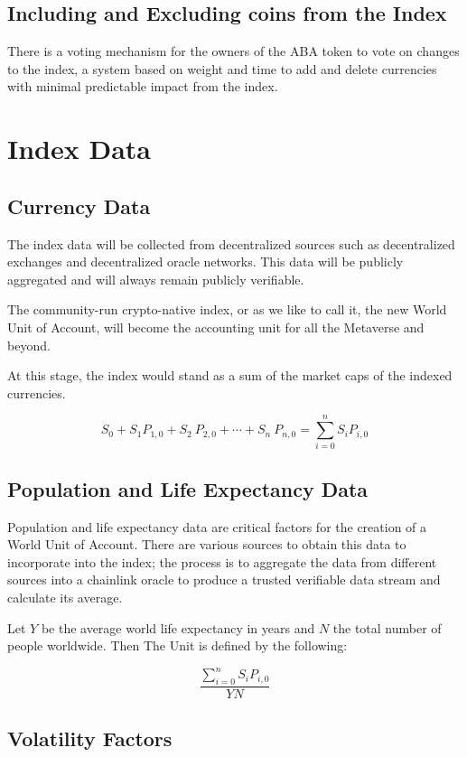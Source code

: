 \documentclass[12pt]{article}
\begin{document}
\subsection{Including and Excluding coins from the Index}

There is a voting mechanism for the owners of the ABA token to vote on changes to the index, a system based on weight and time to add and delete currencies with minimal predictable impact from the index.


\section{Index Data}

\subsection{Currency Data}

The index data will be collected from decentralized sources such as decentralized exchanges and decentralized oracle networks. This data will be publicly aggregated and will always remain publicly verifiable. 

The community-run crypto-native index, or as we like to call it, the new World Unit of Account, will become the accounting unit for all the Metaverse and beyond. 

At this stage, the index would stand as a sum of the market caps of the indexed currencies. 

$$
S_0+S_1 P_{1,0}+ S_2\ P_{2,0}+\cdots+ S_n\ P_{n,0} = \sum_{i=0}^{n} S_iP_{i,0}
$$

\subsection{Population and Life Expectancy Data}

Population and life expectancy data are critical factors for the creation of a World Unit of Account. There are various sources to obtain this data to incorporate into the index; the process is to aggregate the data from different sources into a chainlink oracle to produce a trusted verifiable data stream and calculate its average. 


Let $Y$ be the average world life expectancy in years and $N$ the total number of people worldwide. Then The Unit is defined by the following:

$$
\frac{\displaystyle{\sum_{i=0}^{n} S_iP_{i,0}}}{Y N}
$$

\subsection{Volatility Factors}
\end{document}
